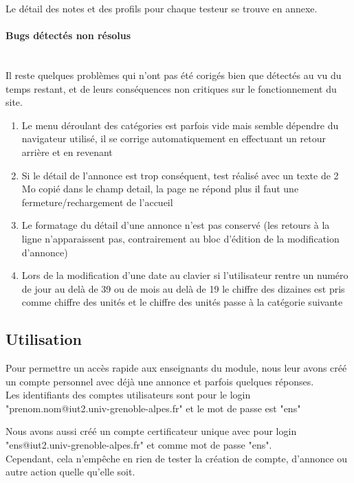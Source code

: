 \documentclass[a4paper,11pt]{article}
\begin{document}
Le détail des notes et des profils pour chaque testeur se trouve en annexe.

\paragraph{Bugs détectés non résolus}\mbox{} \\
Il reste quelques problèmes qui n'ont pas été corigés bien que détectés au vu du temps restant,
et de leurs conséquences non critiques sur le fonctionnement du site.
\begin{enumerate}
  \item Le menu déroulant des catégories est parfois vide mais semble dépendre du navigateur utilisé, il se corrige automatiquement en effectuant un retour arrière et en revenant
  \item Si le détail de l'annonce est trop conséquent, test réalisé avec un texte de 2 Mo copié dans le champ detail, la page ne répond plus il faut une fermeture/rechargement de l'accueil
  \item Le formatage du détail d'une annonce n'est pas conservé (les retours à la ligne n'apparaissent pas, contrairement au bloc d'édition de la modification d'annonce)
  \item Lors de la modification d'une date au clavier si l'utilisateur rentre un numéro de jour au delà de 39 ou de mois au delà de 19 le chiffre des dizaines est pris comme chiffre des unités et le chiffre des unités passe à la catégorie suivante
\end{enumerate}


\subsection{Utilisation}

Pour permettre un accès rapide aux enseignants du module, nous leur avons créé un compte personnel avec déjà une annonce et parfois quelques réponses.\\

Les identifiants des comptes utilisateurs sont pour le login "prenom.nom@iut2.univ-grenoble-alpes.fr" et le mot de passe est "ens"

Nous avons aussi créé un compte certificateur unique avec pour login "ens@iut2.univ-grenoble-alpes.fr" et comme mot de passe "ens".\\

Cependant, cela n'empêche en rien de tester la création de compte, d'annonce ou autre action quelle qu'elle soit.
\end{document}
